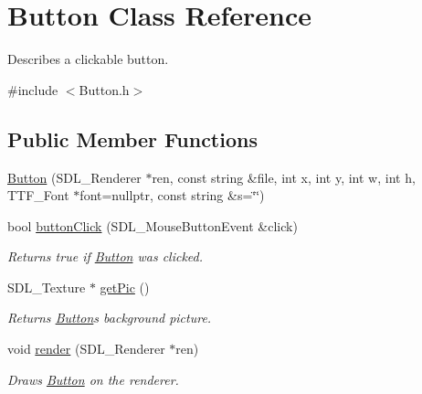 \hypertarget{class_button}{}\section{Button Class Reference}
\label{class_button}


Describes a clickable button.  




{\ttfamily \#include $<$Button.\+h$>$}

\subsection*{Public Member Functions}
\begin{DoxyCompactItemize}
\item 
\hyperlink{class_button_a605828617975a0a3a330dbebbfa736bf}{Button} (S\+D\+L\+\_\+\+Renderer $\ast$ren, const string \&file, int x, int y, int w, int h, T\+T\+F\+\_\+\+Font $\ast$font=nullptr, const string \&s=\char`\"{}\char`\"{})
\item 
bool \hyperlink{class_button_a374d116950c2390f883088c7afb107d6}{button\+Click} (S\+D\+L\+\_\+\+Mouse\+Button\+Event \&click)\hypertarget{class_button_a374d116950c2390f883088c7afb107d6}{}\label{class_button_a374d116950c2390f883088c7afb107d6}

\begin{DoxyCompactList}\small\item\em Returns true if \hyperlink{class_button}{Button} was clicked. \end{DoxyCompactList}\item 
S\+D\+L\+\_\+\+Texture $\ast$ \hyperlink{class_button_ab22d97c11b0e63f90ef584fc9a5c0f6d}{get\+Pic} ()\hypertarget{class_button_ab22d97c11b0e63f90ef584fc9a5c0f6d}{}\label{class_button_ab22d97c11b0e63f90ef584fc9a5c0f6d}

\begin{DoxyCompactList}\small\item\em Returns \hyperlink{class_button}{Button}\textquotesingle{}s background picture. \end{DoxyCompactList}\item 
void \hyperlink{class_button_a599b95776f845111b8245ff15c13f2f1}{render} (S\+D\+L\+\_\+\+Renderer $\ast$ren)\hypertarget{class_button_a599b95776f845111b8245ff15c13f2f1}{}\label{class_button_a599b95776f845111b8245ff15c13f2f1}

\begin{DoxyCompactList}\small\item\em Draws \hyperlink{class_button}{Button} on the renderer. \end{DoxyCompactList}\end{DoxyCompactItemize}
